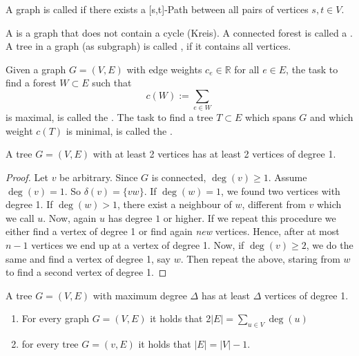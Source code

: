 \begin{lec}[2011-10-13]\end{lec}


\begin{defn}[connected]
A graph is called  if there exists a [s,t]-Path between all pairs of vertices $s,t \in V$.
\end{defn}

\begin{defn}
A  is a graph that does not contain a cycle (Kreis). A connected forest is called a
. A tree in a graph (as subgraph) is called
, if it contains all vertices.

Given a graph $G=(V,E)$ with edge weights $c_e \in \mathbb{R}$ for all $e \in E$, the task to find a forest $W \subset E$ such that \[c(W):=\sum\limits_{e\in W} \] is maximal, is called the
. 
The task to find a tree $T\subset E$ which spans $G$ and which weight $c(T)$ is minimal, is called the
.
\end{defn}

\begin{lem}
A tree $G=(V,E)$ with at least 2 vertices has at least 2 vertices of degree 1.
\end{lem}
\begin{proof}
Let $v$ be arbitrary. Since $G$ is connected, $\deg(v) \geq 1$. Assume $\deg(v)=1$. So $\delta(v)=\{vw\}$. If $\deg(w)=1$, we found two vertices with degree 1. If $\deg(w)>1$, there exist a neighbour of $w$, different from $v$ which we call $u$. Now, again $u$ has degree $1$ or higher. If we repeat this procedure we either find a vertex of degree 1 or find again \emph{new} vertices. Hence, after at most $n-1$ vertices we end up at a vertex of degree 1. 
Now, if $\deg(v) \geq 2$, we do the same and find a vertex of degree 1, say $w$. Then repeat the above, staring from $w$ to find a second vertex of degree 1.
\end{proof}

\begin{cor}
A tree $G=(V,E)$ with maximum degree $\Delta$ has at least $\Delta$ vertices of degree 1.
\end{cor}

\begin{lem}
	\begin{enumerate}
	\item For every graph $G=(V,E)$ it holds that 2$|E|=\sum\limits_{u \in V} \deg(u)$
	\item for every tree $G=(v,E)$ it holds that $|E|=|V|-1$.
	\end{enumerate}
	\end{lem}

